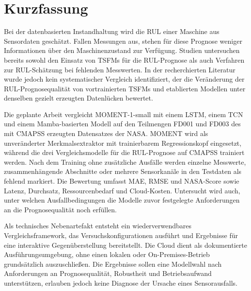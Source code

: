 

\chapter*{Kurzfassung}

Bei der datenbasierten Instandhaltung wird die \ac{RUL} einer Maschine aus Sensordaten geschätzt. Fallen Messungen aus, stehen für diese Prognose weniger Informationen über den Maschinenzustand zur Verfügung. Studien untersuchen bereits sowohl den Einsatz von \acp{TSFM} für die \ac{RUL}-Prognose als auch Verfahren zur \ac{RUL}-Schätzung bei fehlenden Messwerten. In der recherchierten Literatur wurde jedoch kein systematischer Vergleich identifiziert, der die Veränderung der \ac{RUL}-Prognosequalität von vortrainierten \acp{TSFM} und etablierten Modellen unter denselben gezielt erzeugten Datenlücken bewertet.

Die geplante Arbeit vergleicht MOMENT-1-small mit einem \ac{LSTM}, einem \ac{TCN} und einem Mamba-basierten Modell auf den Teilmengen FD001 und FD003 des mit \ac{CMAPSS} erzeugten Datensatzes der \ac{NASA}. MOMENT wird als unveränderter Merkmalsextraktor mit trainierbarem Regressionskopf eingesetzt, während die drei Vergleichsmodelle für die \ac{RUL}-Prognose auf \ac{CMAPSS} trainiert werden. Nach dem Training ohne zusätzliche Ausfälle werden einzelne Messwerte, zusammenhängende Abschnitte oder mehrere Sensorkanäle in den Testdaten als fehlend markiert. Die Bewertung umfasst \ac{MAE}, \ac{RMSE} und \ac{NASA}-Score sowie Latenz, Durchsatz, Ressourcenbedarf und Cloud-Kosten. Untersucht wird auch, unter welchen Ausfallbedingungen die Modelle zuvor festgelegte Anforderungen an die Prognosequalität noch erfüllen.

Als technisches Nebenartefakt entsteht ein wiederverwendbares Vergleichsframework, das Versuchskonfigurationen ausführt und Ergebnisse für eine interaktive Gegenüberstellung bereitstellt. Die Cloud dient als dokumentierte Ausführungsumgebung, ohne einen lokalen oder On-Premises-Betrieb grundsätzlich auszuschließen. Die Ergebnisse sollen eine Modellwahl nach Anforderungen an Prognosequalität, Robustheit und Betriebsaufwand unterstützen, erlauben jedoch keine Diagnose der Ursache eines Sensorausfalls.

\clearpage
